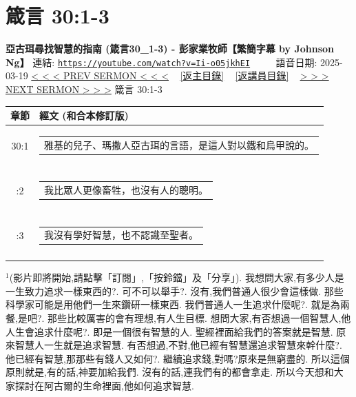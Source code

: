 \documentclass{book}
\begin{document}
\section{箴言 30:1-3}
\label{sec:Ii_o05jkhEI}
\textbf{亞古珥尋找智慧的指南 (箴言30\_1-3) - 彭家業牧師【繁簡字幕 by Johnson Ng】}
\newline
\newline
連結: \href{https://youtube.com/watch?v=Ii-o05jkhEI}{\texttt{https://youtube.com/watch?v=Ii-o05jkhEI}} ~~~~ 語音日期: 2025-03-19
\newline
\newline
\hyperref[sec:fmQ_KmzoEKE]{< < < PREV SERMON < < <}
~
\hyperlink{toc}{[返主目錄]}
~
\hyperref[ch:preacher2]{[返講員目錄]}
~
\hyperref[sec:pb5NDTZL6gI]{> > > NEXT SERMON > > >}
\newline
\newline
箴言 30:1-3
\newline
\begin{longtable}{cl}
\hline
\hline
章節 & 經文 (和合本修訂版)\\
\hline
30:1 & \begin{tabularx}{0.7\textwidth}{X} 雅基的兒子、瑪撒人亞古珥的言語，是這人對以鐵和烏甲說的。 \end{tabularx} \\ \\ \relax
30:2 & \begin{tabularx}{0.7\textwidth}{X} 我比眾人更像畜牲，也沒有人的聰明。 \end{tabularx} \\ \\ \relax
30:3 & \begin{tabularx}{0.7\textwidth}{X} 我沒有學好智慧，也不認識至聖者。 \end{tabularx} \\ \\
[1ex]
\hline
\hline
\end{longtable}
$^{1}$(影片即將開始,請點擊「訂閱」,「按鈴鐺」及「分享」).
我想問大家,有多少人是一生致力追求一樣東西的?.
可不可以舉手?.
沒有,我們普通人很少會這樣做.
那些科學家可能是用他們一生來鑽研一樣東西.
我們普通人一生追求什麼呢?.
就是為兩餐,是吧?.
那些比較厲害的會有理想,有人生目標.
想問大家,有否想過一個智慧人,他人生會追求什麼呢?.
即是一個很有智慧的人.
聖經裡面給我們的答案就是智慧.
原來智慧人一生就是追求智慧.
有否想過,不對,他已經有智慧還追求智慧來幹什麼?.
他已經有智慧,那那些有錢人又如何?.
繼續追求錢,對嗎?原來是無窮盡的.
所以這個原則就是,有的話,神要加給我們.
沒有的話,連我們有的都會拿走.
所以今天想和大家探討在阿古爾的生命裡面,他如何追求智慧.
\end{document}

